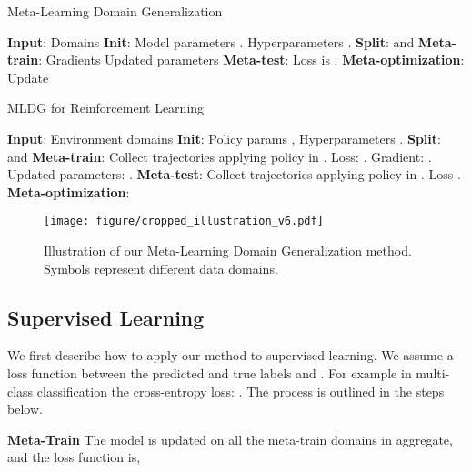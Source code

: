 \documentclass[letterpaper]{article} \usepackage{aaai18}  \usepackage{times}  \usepackage{helvet}  \usepackage{courier}  \usepackage{url}  \usepackage{graphicx}  \usepackage{amsmath}
\newcommand{\keypoint}[1]{\vspace{0.1cm}\noindent\textbf{#1}\quad}
\begin{document}
\begin{algorithm}[t]
   \caption{Meta-Learning Domain Generalization}\label{alg:mldg}
\begin{algorithmic}[1]
\State \textbf{Input}: Domains 
\State \textbf{Init}: Model parameters .  Hyperparameters .
\State \textbf{Split}:  and  
\State \textbf{Meta-train}: Gradients 
\State Updated parameters  \State \textbf{Meta-test}: Loss is .
\State \textbf{Meta-optimization}: Update 



\EndFor
\EndProcedure
\end{algorithmic}
  \end{algorithm}




  \begin{algorithm}[t]
   \caption{MLDG for Reinforcement Learning}\label{alg:mldg-rl}
\begin{algorithmic}[1]
\State \textbf{Input}: Environment domains 
\State \textbf{Init}: Policy params , Hyperparameters .
\State \textbf{Split}:  and  
\State \textbf{Meta-train}: 
\State Collect trajectories  applying policy  in .
\State Loss: .
\State Gradient: .
\State Updated parameters: .
\State \textbf{Meta-test}: \State Collect trajectories  applying policy  in .
\State Loss .
\State \textbf{Meta-optimization}: 
\EndFor
\EndProcedure
\end{algorithmic}
  \end{algorithm}
  
\begin{figure}[t]
\centering
\texttt{[image: figure/cropped\_illustration\_v6.pdf]}
\caption{Illustration of our Meta-Learning Domain Generalization method. Symbols represent different data domains.}
\label{illustration}
\end{figure}
  
\subsection{Supervised Learning}

We first describe how to apply our method to supervised learning. We assume a loss function  between the predicted and true labels  and . For example in multi-class classification the cross-entropy loss: . The process is outlined in the steps below. 

\keypoint{Meta-Train} The model is updated on all the  meta-train domains  in aggregate, and the loss function is,
\end{document}
